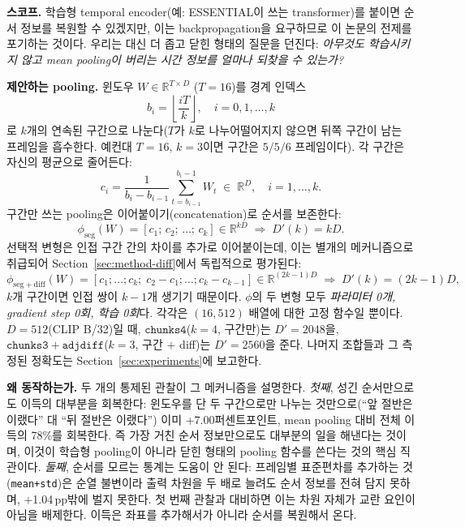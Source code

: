 \documentclass[11pt]{article}
\begin{document}
\textbf{스코프.} 학습형 temporal encoder(예: ESSENTIAL이 쓰는
transformer)를 붙이면 순서 정보를 복원할 수 있겠지만, 이는
backpropagation을 요구하므로 이 논문의 전제를 포기하는 것이다. 우리는
대신 더 좁고 닫힌 형태의 질문을 던진다: \emph{아무것도 학습시키지 않고
mean pooling이 버리는 시간 정보를 얼마나 되찾을 수 있는가?}

\textbf{제안하는 pooling.} 윈도우 $W \in \mathbb{R}^{T \times D}$
($T{=}16$)를 경계 인덱스
\begin{equation}
b_i = \left\lfloor \frac{iT}{k} \right\rfloor, \quad i = 0,1,\ldots,k
\end{equation}
로 $k$개의 연속된 구간으로 나눈다($T$가 $k$로 나누어떨어지지 않으면 뒤쪽
구간이 남는 프레임을 흡수한다. 예컨대 $T{=}16,\,k{=}3$이면 구간은
$5/5/6$ 프레임이다). 각 구간은 자신의 평균으로 줄어든다:
\begin{equation}
c_i = \frac{1}{b_i - b_{i-1}} \sum_{t=b_{i-1}}^{b_i - 1} W_t \;\in\; \mathbb{R}^D,
\quad i = 1,\ldots,k .
\end{equation}
구간만 쓰는 pooling은 이어붙이기(concatenation)로 순서를 보존한다:
\begin{equation}
\phi_{\mathrm{seg}}(W) = [c_1;\,c_2;\,\ldots;\,c_k] \in \mathbb{R}^{kD}
\;\Longrightarrow\; D'(k) = kD .
\end{equation}
선택적 변형은 인접 구간 간의 차이를 추가로 이어붙이는데, 이는 별개의
메커니즘으로 취급되어 Section~\ref{sec:method-diff}에서 독립적으로 평가된다:
\begin{equation}
\phi_{\mathrm{seg+diff}}(W) = [c_1;\ldots;c_k;\; c_2{-}c_1;\ldots;c_k{-}c_{k-1}]
\in \mathbb{R}^{(2k-1)D}
\;\Longrightarrow\; D'(k) = (2k-1)D ,
\end{equation}
$k$개 구간이면 인접 쌍이 $k{-}1$개 생기기 때문이다. $\phi$의 두 변형
모두 \emph{파라미터 0개, gradient step 0회, 학습 0회}다. 각각은
$(16,512)$ 배열에 대한 고정 함수일 뿐이다. $D{=}512$(CLIP B/32)일 때,
$\mathtt{chunks4}$($k{=}4$, 구간만)는 $D'{=}2048$을,
$\mathtt{chunks3{+}adjdiff}$($k{=}3$, 구간 $+$ diff)는 $D'{=}2560$을
준다. 나머지 조합들과 그 측정된 정확도는 Section~\ref{sec:experiments}에
보고한다.

\textbf{왜 동작하는가.} 두 개의 통제된 관찰이 그 메커니즘을 설명한다.
\emph{첫째}, 성긴 순서만으로도 이득의 대부분을 회복한다: 윈도우를 단 두
구간으로만 나누는 것만으로(``앞 절반은 이랬다'' 대 ``뒤 절반은 이랬다'')
이미 +7.00퍼센트포인트, mean pooling 대비 전체 이득의 78\%를 회복한다.
즉 가장 거친 순서 정보만으로도 대부분의 일을 해낸다는 것이며, 이것이
학습형 pooling이 아니라 닫힌 형태의 pooling 함수를 쓴다는 것의 핵심
직관이다. \emph{둘째}, 순서를 모르는 통계는 도움이 안 된다: 프레임별
표준편차를 추가하는 것(\texttt{mean+std})은 순열 불변이라 출력 차원을
두 배로 늘려도 순서 정보를 전혀 담지 못하며, +1.04\,pp밖에 벌지 못한다.
첫 번째 관찰과 대비하면 이는 차원 자체가 교란 요인이 아님을 배제한다.
이득은 좌표를 추가해서가 아니라 순서를 복원해서 온다.
\end{document}

